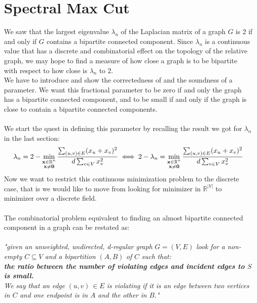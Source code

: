 \section{Spectral Max Cut}
We saw that the largest eigenvalue $ \lambda_n $ of the Laplacian matrix of a graph $ G $ is $ 2 $ if and only if $ G $ contains a bipartite connected component. Since $ \lambda_n $ is a continuous value that has a discrete and combinatorial effect on the topology of the relative graph, we may hope to find a measure of how close a graph is to be bipartite with respect to how close is $ \lambda_n $ to $ 2 $. \\
We have to introduce and show the correctedness of and the soundness of a parameter.
We want this fractional parameter to be zero
if and only
the graph has a bipartite connected component, 
and to be small if and only if the graph is
close to contain a bipartite connected components. 
\\
\\
We start the quest in defining this parameter by recalling the result we got for $ \lambda_n $ in the last section:
\[
\lambda_n = 2 - \min_{\substack{\mathbf{x} \in \mathbb{R}^n \\ \mathbf{x} \ne \mathbf{0}}} \frac{\sum_{(u,v)\in E}(x_u+x_v)^2}{d \sum_{v \in V} x_v^2 } \\
\iff 
2-\lambda_n = \min_{\substack{\mathbf{x} \in \mathbb{R}^n \\ \mathbf{x} \ne \mathbf{0}}} \frac{\sum_{(u,v)\in E}(x_u+x_v)^2}{d \sum_{v \in V} x_v^2 }  \]
Now we want to restrict this continuous minimization problem to the discrete case, that is we would like to move from looking for minimizer in $ \mathbb{R}^{|V|} $ to minimizer over a discrete field. 
\\
\\
The combinatorial problem equivalent to finding an almost bipartite connected component in a graph can be restated as: \\ \\
\emph{"given an unweighted, undirected, d-regular graph $ G = (V,E) $ look for a non-empty $ C \subseteq V $ and a bipartition $ (A,B) $ of $ C $ such that:
\\
\textbf{the ratio between the number of violating edges and incident edges to $ S $ is small.}
\\
We say that an edge $ (u,v)\, \in E $ is violating if it is an edge between two vertices in $ C $ and one endpoint is in $ A $ and the other in $ B $."}
\\
\\
